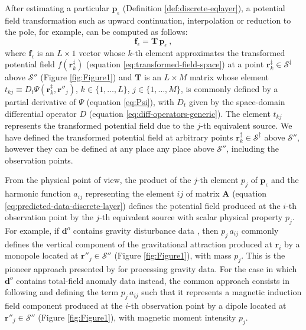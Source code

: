 After estimating a particular $\mathbf{p}_{\epsilon}$ (Definition \ref{def:discrete-eqlayer}), 
a potential field transformation such as upward continuation, 
interpolation or reduction to the pole, for example, can be computed as follows:
\begin{equation}
	\mathbf{f}_{\epsilon} = \mathbf{T} \, \mathbf{p}_{\epsilon} \: ,
	\label{eq:transformed-field-discrete-layer} 
\end{equation}
where $\mathbf{f}_{\epsilon}$ is an $L \times 1$ vector whose $k$-th element approximates 
the transformed potential field $f(\mathbf{r}^{\ddagger}_{k})$ (equation \ref{eq:transformed-field-space}) 
at a point $\mathbf{r}^{\ddagger}_{k} \in \mathcal{S}^{\ddagger}$ above $\mathcal{S}''$ (Figure \ref{fig:Figure1})
and $\mathbf{T}$ is an $L \times M$ matrix whose element $t_{kj} \equiv D_{t} \Psi(\mathbf{r}^{\ddagger}_{k}, \mathbf{r}''_{j})$,
$k \in \{ 1, \dots, L \}$, $j \in \{ 1, \dots, M \}$, 
is commonly defined by a partial derivative of $\Psi$ (equation \ref{eq:Psi}), with $D_{t}$ given by the 
space-domain differential operator $D$ (equation \ref{eq:diff-operators-generic}).
The element $t_{kj}$ represents the transformed potential field due to the $j$-th equivalent source. 
We have defined the transformed potential field at arbitrary points 
$\mathbf{r}^{\ddagger}_{k} \in \mathcal{S}^{\ddagger}$ above $\mathcal{S}''$, however they 
can be defined at any place any place above $\mathcal{S}''$, including the observation points. 

From the physical point of view, the product of the $j$-th element $p_{j}$ of $\mathbf{p}_{\epsilon}$ 
and the harmonic function $a_{ij}$ representing the element $ij$ of matrix $\mathbf{A}$ 
(equation \ref{eq:predicted-data-discrete-layer}) defines the potential field produced at the $i$-th observation
point by the $j$-th equivalent source with scalar physical property $p_{j}$.
For example, if $\mathbf{d}^{o}$ contains gravity disturbance data
\cite[e.g.,][ p. 93]{hofmann-wellenhof-moritz2005}, then
$p_{j} \, a_{ij}$ commonly defines the vertical component of the gravitational attraction
produced at $\mathbf{r}_{i}$ by a monopole located at
$\mathbf{r}''_{j} \in \mathcal{S}''$ (Figure \ref{fig:Figure1}), with mass $p_{j}$. 
This is the pioneer approach presented by \cite{dampney1969} for 
processing gravity data.
For the case in which $\mathbf{d}^{o}$ contains total-field anomaly data 
\cite[e.g.,][ p. 178]{blakely1996} instead, the common approach consists in
following \cite{emilia1973} and defining the term $p_{j} \, a_{ij}$ such
that it represents a magnetic induction field component 
produced at the $i$-th observation point by a dipole located at 
$\mathbf{r}''_{j} \in \mathcal{S}''$ (Figure \ref{fig:Figure1}), with magnetic moment intensity $p_{j}$.

